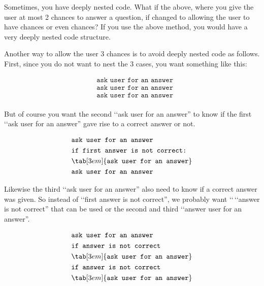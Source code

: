 Sometimes, you have deeply nested code. What if the above, where you
give the user at most 2 chances to answer a question, if changed to
allowing the user to have  chances or even  chances?
If you use the above method, you would have a very deeply nested code
structure.

Another way to allow the user 3 chances is to avoid deeply nested code
as follows. First, since you do not want to nest the 3 cases, you want
something like this:

\begin{align*}
&\texttt{ask user for an answer}\\
&\texttt{ask user for an answer}\\
&\texttt{ask user for an answer}\\
\end{align*}

But of course you want the second \lq\lq ask user for an answer'' to know if
the first \lq\lq ask user for an answer'' gave rise to a correct answer or
not.

\begin{align*}
&\texttt{ask user for an answer}\\
&\texttt{if first answer is not correct:}\\
&\tab[3em]{\texttt{ask user for an answer}}\\
&\texttt{ask user for an answer}\\
\end{align*}

Likewise the third \lq\lq ask user for an answer'' also need to know if a
correct answer was given. So instead of \lq\lq first answer is not correct'',
we probably want \lq\lq \,\lq\lq answer is not correct'' that can be used or the second and third \lq\lq answer user for an answer''.

\begin{align*}
&\texttt{ask user for an answer}\\
&\texttt{if answer is not correct}\\
&\tab[3em]{\texttt{ask user for an answer}}\\
&\texttt{if answer is not correct}\\
&\tab[3em]{\texttt{ask user for an answer}}\\
\end{align*}

